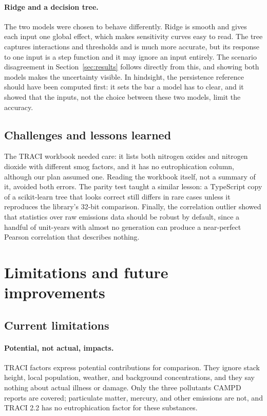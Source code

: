\documentclass[11pt,a4paper]{article}
\begin{document}
\paragraph{Ridge and a decision tree.} The two models were chosen to behave differently. Ridge
is smooth and gives each input one global effect, which makes sensitivity curves easy to read.
The tree captures interactions and thresholds and is much more accurate, but its response to one
input is a step function and it may ignore an input entirely. The scenario disagreement in
Section~\ref{sec:results} follows directly from this, and showing both models makes the
uncertainty visible. In hindsight, the persistence reference should have been computed first:
it sets the bar a model has to clear, and it showed that the inputs, not the choice between
these two models, limit the accuracy.

\subsection{Challenges and lessons learned}

The TRACI workbook needed care: it lists both nitrogen oxides and nitrogen dioxide with
different smog factors, and it has no eutrophication column, although our plan assumed one.
Reading the workbook itself, not a summary of it, avoided both errors. The parity test taught a
similar lesson: a TypeScript copy of a scikit-learn tree that looks correct still differs in
rare cases unless it reproduces the library's 32-bit comparison. Finally, the correlation
outlier showed that statistics over raw emissions data should be robust by default, since a
handful of unit-years with almost no generation can produce a near-perfect Pearson correlation
that describes nothing.

\section{Limitations and future improvements}
\label{sec:limitations}

\subsection{Current limitations}

\paragraph{Potential, not actual, impacts.} TRACI factors express potential contributions for
comparison. They ignore stack height, local population, weather, and background
concentrations, and they say nothing about actual illness or damage. Only the three pollutants
CAMPD reports are covered; particulate matter, mercury, and other emissions are not, and TRACI
2.2 has no eutrophication factor for these substances.
\end{document}
